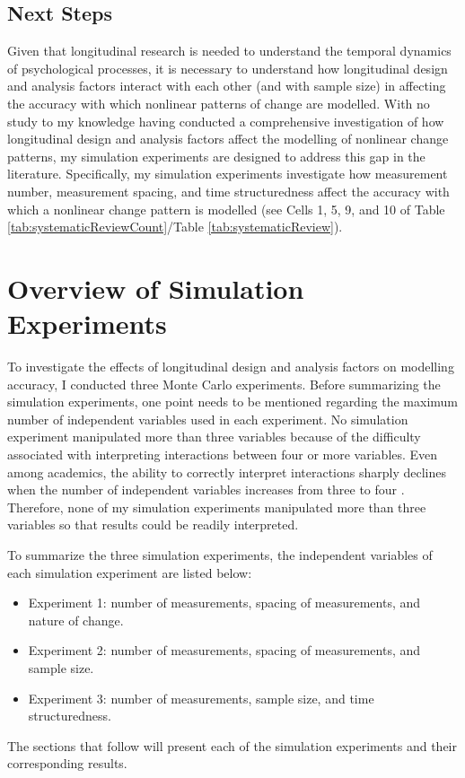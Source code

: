\documentclass[
12pt, %
twoside,
english]{guelphthesis}
\begin{document}
\hypertarget{next-steps}{%
\subsection{Next Steps}\label{next-steps}}

Given that longitudinal research is needed to understand the temporal dynamics of psychological processes, it is necessary to understand how longitudinal design and analysis factors interact with each other (and with sample size) in affecting the accuracy with which nonlinear patterns of change are modelled. With no study to my knowledge having conducted a comprehensive investigation of how longitudinal design and analysis factors affect the modelling of nonlinear change patterns, my simulation experiments are designed to address this gap in the literature. Specifically, my simulation experiments investigate how measurement number, measurement spacing, and time structuredness affect the accuracy with which a nonlinear change pattern is modelled (see Cells 1, 5, 9, and 10 of Table \ref{tab:systematicReviewCount}/Table \ref{tab:systematicReview}).

\hypertarget{overview-of-simulation-experiments}{%
\section{Overview of Simulation Experiments}\label{overview-of-simulation-experiments}}

To investigate the effects of longitudinal design and analysis factors on modelling accuracy, I conducted three Monte Carlo experiments. Before summarizing the simulation experiments, one point needs to be mentioned regarding the maximum number of independent variables used in each experiment. No simulation experiment manipulated more than three variables because of the difficulty associated with interpreting interactions between four or more variables. Even among academics, the ability to correctly interpret interactions sharply declines when the number of independent variables increases from three to four \autocite{halford2005}. Therefore, none of my simulation experiments manipulated more than three variables so that results could be readily interpreted.

To summarize the three simulation experiments, the independent variables of each simulation experiment are listed below:
\begin{itemize}
\tightlist
\item
  Experiment 1: number of measurements, spacing of measurements, and nature of change.
\item
  Experiment 2: number of measurements, spacing of measurements, and sample size.
\item
  Experiment 3: number of measurements, sample size, and time structuredness.
\end{itemize}
\noindent The sections that follow will present each of the simulation experiments and their corresponding results.
\end{document}

